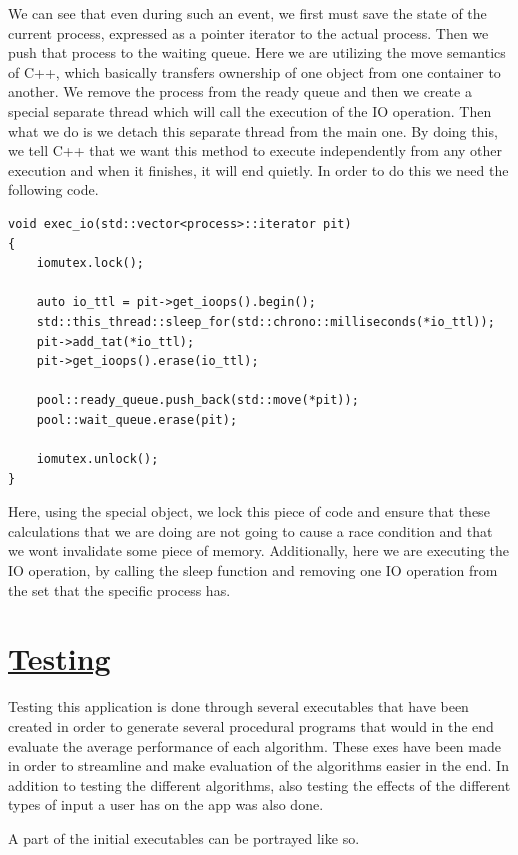\documentclass{article}
\newcommand{\code}[1]{\codeinline{\texttt{#1}}}
\begin{document}
We can see that even during such an event, we first must save the state of the current process, expressed as a pointer iterator to the actual process. Then we push that process to the waiting queue. Here we are utilizing the move semantics of C++, which basically transfers ownership of one object from one container to another. We remove the process from the ready queue and then we create a special separate thread which will call the execution of the IO operation. Then what we do is we detach this separate thread from the main one. By doing this, we tell C++ that we want this method to execute independently from any other execution and when it finishes, it will end quietly. In order to do this we need the following code.

\begin{lstlisting}
void exec_io(std::vector<process>::iterator pit)
{
    iomutex.lock();

    auto io_ttl = pit->get_ioops().begin();
    std::this_thread::sleep_for(std::chrono::milliseconds(*io_ttl));
    pit->add_tat(*io_ttl);
    pit->get_ioops().erase(io_ttl);

    pool::ready_queue.push_back(std::move(*pit));
    pool::wait_queue.erase(pit);

    iomutex.unlock();
}
\end{lstlisting}

Here, using the special \code{iomutex} object, we lock this piece of code and ensure that these calculations that we are doing are not going to cause a race condition and that we wont invalidate some piece of memory. Additionally, here we are executing the IO operation, by calling the sleep function and removing one IO operation from the set that the specific process has.

\section{\underline{Testing}}

Testing this application is done through several executables that have been created in order to generate several procedural programs that would in the end evaluate the average performance of each algorithm. These exes have been made in order to streamline and make evaluation of the algorithms easier in the end. In addition to testing the different algorithms, also testing the effects of the different types of input a user has on the app was also done.

A part of the initial executables can be portrayed like so.
\end{document}
